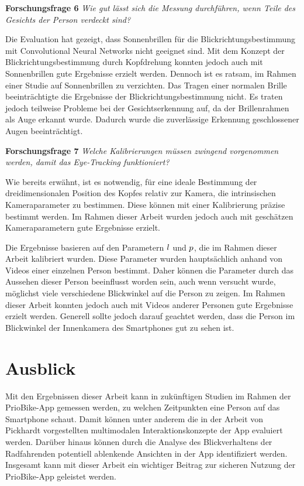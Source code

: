 \vspace{0.3cm}
\noindent\textbf{Forschungsfrage 6} \textit{Wie gut lässt sich die Messung durchführen, wenn Teile des Gesichts der Person verdeckt sind?}
\vspace{0.3cm}

Die Evaluation hat gezeigt, dass Sonnenbrillen für die Blickrichtungsbestimmung mit Convolutional Neural Networks nicht geeignet sind. Mit dem Konzept der Blickrichtungsbestimmung durch Kopfdrehung konnten jedoch auch mit Sonnenbrillen gute Ergebnisse erzielt werden. Dennoch ist es ratsam, im Rahmen einer Studie auf Sonnenbrillen zu verzichten. Das Tragen einer normalen Brille beeinträchtigte die Ergebnisse der Blickrichtungsbestimmung nicht. Es traten jedoch teilweise Probleme bei der Gesichtserkennung auf, da der Brillenrahmen als Auge erkannt wurde. Dadurch wurde die zuverlässige Erkennung geschlossener Augen beeinträchtigt.

\vspace{0.3cm}
\noindent\textbf{Forschungsfrage 7} \textit{Welche Kalibrierungen müssen zwingend vorgenommen werden, damit das Eye-Tracking funktioniert?}
\vspace{0.3cm}

Wie bereits erwähnt, ist es notwendig, für eine ideale Bestimmung der dreidimensionalen Position des Kopfes relativ zur Kamera, die intrinsischen Kameraparameter zu bestimmen. Diese können mit einer Kalibrierung präzise bestimmt werden. Im Rahmen dieser Arbeit wurden jedoch auch mit geschätzen Kameraparametern gute Ergebnisse erzielt.

Die Ergebnisse basieren auf den Parametern $l$ und $p$, die im Rahmen dieser Arbeit kalibriert wurden. Diese Parameter wurden hauptsächlich anhand von Videos einer einzelnen Person bestimmt. Daher können die Parameter durch das Aussehen dieser Person beeinflusst worden sein, auch wenn versucht wurde, möglichst viele verschiedene Blickwinkel auf die Person zu zeigen. Im Rahmen dieser Arbeit konnten jedoch auch mit Videos anderer Personen gute Ergebnisse erzielt werden. Generell sollte jedoch darauf geachtet werden, dass die Person im Blickwinkel der Innenkamera des Smartphones gut zu sehen ist.  


\section{Ausblick}

Mit den Ergebnissen dieser Arbeit kann in zukünftigen Studien im Rahmen der PrioBike-App gemessen werden, zu welchen Zeitpunkten eine Person auf das Smartphone schaut. Damit können unter anderem die in der Arbeit von Pickhardt \cite{diplom:paul:pickhardt} vorgestellten multimodalen Interaktionskonzepte der App evaluiert werden. Darüber hinaus können durch die Analyse des Blickverhaltens der Radfahrenden potentiell ablenkende Ansichten in der App identifiziert werden. Insgesamt kann mit dieser Arbeit ein wichtiger Beitrag zur sicheren Nutzung der PrioBike-App geleistet werden.

